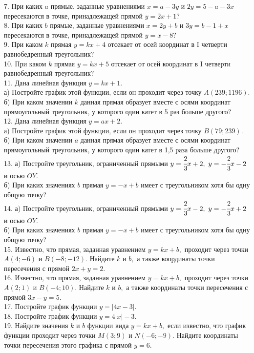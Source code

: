 \documentclass[12pt]{article}
\begin{document}
7. При каких $a$ прямые, заданные уравнениями $x=a-3y$ и $2y=5-a-3x$ пересекаются в точке, принадлежащей прямой $y=2x+1?$\\
8. При каких $b$ прямые, заданные уравнениями $x=2y+b$ и $3y=b-1+x$ пересекаются в точке, принадлежащей прямой $y=x-8?$\\
9. При каком $k$ прямая $y=kx+4$ отсекает от осей координат в I четверти равнобедренный треугольник?\\
10. При каком $k$ прямая $y=kx+5$ отсекает от осей координат в I четверти равнобедренный треугольник?\\
11. Дана линейная функция $y=kx+1.$\\
а) Постройте график этой функции, если он проходит через точку $A(239;1196).$\\
б) При каком значении $k$ данная прямая образует вместе с осями координат прямоугольный треугольник, у которого один катет в 5 раз больше другого?\\
12. Дана линейная функция $y=ax+2.$\\
а) Постройте график этой функции, если он проходит через точку $B(79;239).$\\
б) При каком значении $a$ данная прямая образует вместе с осями координат прямоугольный треугольник, у которого один катет в 1,5 раза больше другого?\\
13. а) Постройте треугольник, ограниченный прямыми $y=\cfrac{2}{3}x+2,\ y=-\cfrac{2}{3}x-2$ и осью $OY.$\\
б) При каких значениях $b$ прямая $y=-x+b$ имеет с треугольником хотя бы одну общую точку?\\
14. а) Постройте треугольник, ограниченный прямыми $y=\cfrac{2}{3}x-2,\ y=-\cfrac{2}{3}x+2$ и осью $OY.$\\
б) При каких значениях $b$ прямая $y=-x+b$ имеет с треугольником хотя бы одну общую точку?\\
15. Известно, что прямая, заданная уравнением $y=kx+b,$ проходит через точки $A(4;-6)$ и $B(-8;-12).$ Найдите $k$ и $b,$ а также координаты точки пересечения с прямой $2x+y=2.$\\
16. Известно, что прямая, заданная уравнением $y=kx+b,$ проходит через точки $A(2;1)$ и $B(-4;10).$ Найдите $k$ и $b,$ а также координаты точки пересечения с прямой $3x-y=5.$\\
17. Постройте график функции $y=|4x-3|.$\\
18. Постройте график функции $y=4|x|-3.$\\
19. Найдите значения $k$ и $b$ функции вида $y=kx+b,$ если известно, что график функции проходит через точки $M(3;9)$ и $N(-6;-9).$ Найдите координаты точки пересечения этого графика с прямой $y=6.$\\
\end{document}
